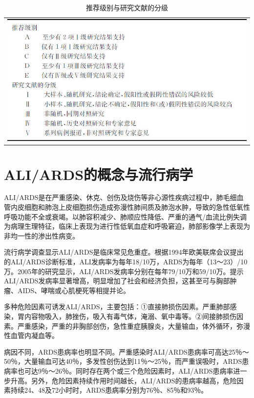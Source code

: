 \begin{longtable}{c}
  \caption{推荐级别与研究文献的分级}
  \label{tabapp-2}
  \endfirsthead
  \caption[]{推荐级别与研究文献的分级}
  \endhead
\includegraphics[width=\textwidth,height=\textheight,keepaspectratio]{./images/Image00300.jpg}
\end{longtable}

\section{ALI/ARDS的概念与流行病学}

ALI/ARDS是在严重感染、休克、创伤及烧伤等非心源性疾病过程中，肺毛细血管内皮细胞和肺泡上皮细胞损伤造成弥漫性肺间质及肺泡水肿，导致的急性低氧性呼吸功能不全或衰竭。以肺容积减少、肺顺应性降低、严重的通气/血流比例失调为病理生理特征，临床上表现为进行性低氧血症和呼吸窘迫，肺部影像学上表现为非均一性的渗出性病变。

流行病学调查显示ALI/ARDS是临床常见危重症。根据1994年欧美联席会议提出的ALI/ARDS诊断标准，ALI发病率为每年18/10万，ARDS为每年（13～23）/10万。2005年的研究显示，ALI/ARDS发病率分别在每年79/10万和59/10万。提示ALI/ARDS发病率显著增高，明显增加了社会和经济负担，这甚至可与胸部肿瘤、AIDS、哮喘或心肌梗死等相提并论。

多种危险因素可诱发ALI/ARDS，主要包括：①直接肺损伤因素。严重肺部感染，胃内容物吸入，肺挫伤，吸入有毒气体，淹溺、氧中毒等。②间接肺损伤因素。严重感染，严重的非胸部创伤，急性重症胰腺炎，大量输血，体外循环，弥漫性血管内凝血等。

病因不同，ARDS患病率也明显不同。严重感染时ALI/ARDS患病率可高达25％～50％，大量输血可达40％，多发性创伤达到11％～25％，而严重误吸时，ARDS患病率也可达9％～26％。同时存在两个或三个危险因素时，ALI/ARDS患病率进一步升高。另外，危险因素持续作用时间越长，ALI/ARDS的患病率越高，危险因素持续24、48及72小时时，ARDS患病率分别为76％、85％和93％。

